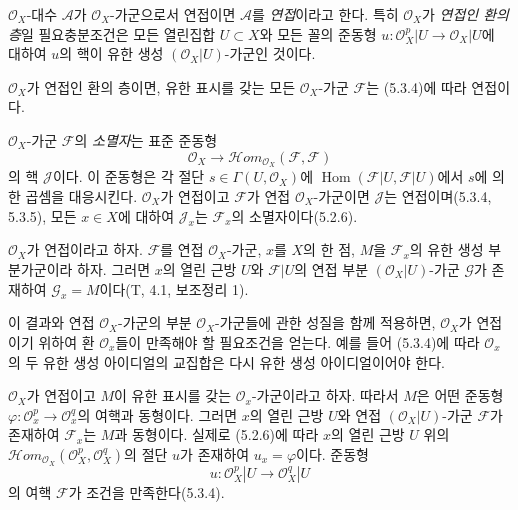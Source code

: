 \begin{env}[5.3.7]
\label{0.5.3.7-ko}
$\mathcal O_X$-대수 $\mathcal A$가 $\mathcal O_X$-가군으로서
연접이면 $\mathcal A$를 \emph{연접}이라고 한다. 특히
$\mathcal O_X$가 \emph{연접인 환의 층}일 필요충분조건은 모든
열린집합 $U\subset X$와 모든 꼴의 준동형
$u:\mathcal O_X^p|U\to\mathcal O_X|U$에 대하여 $u$의 핵이
유한 생성 $(\mathcal O_X|U)$-가군인 것이다.

$\mathcal O_X$가 연접인 환의 층이면, 유한 표시를 갖는 모든
$\mathcal O_X$-가군 $\mathcal F$는 (5.3.4)에 따라 연접이다.

$\mathcal O_X$-가군 $\mathcal F$의 \emph{소멸자}는 표준 준동형
\[
  \mathcal O_X\longrightarrow
  \mathcal H\!om_{\mathcal O_X}(\mathcal F,\mathcal F)
\]
의 핵 $\mathcal J$이다. 이 준동형은 각 절단
$s\in\Gamma(U,\mathcal O_X)$에
$\operatorname{Hom}(\mathcal F|U,\mathcal F|U)$에서 $s$에 의한
곱셈을 대응시킨다. $\mathcal O_X$가 연접이고 $\mathcal F$가 연접
$\mathcal O_X$-가군이면 $\mathcal J$는 연접이며(5.3.4, 5.3.5),
모든 $x\in X$에 대하여 $\mathcal J_x$는 $\mathcal F_x$의
소멸자이다(5.2.6).
\end{env}


\begin{env}[5.3.8]
\label{0.5.3.8-ko}
$\mathcal O_X$가 연접이라고 하자. $\mathcal F$를 연접
$\mathcal O_X$-가군, $x$를 $X$의 한 점, $M$을 $\mathcal F_x$의
유한 생성 부분가군이라 하자. 그러면 $x$의 열린 근방 $U$와
$\mathcal F|U$의 연접 부분 $(\mathcal O_X|U)$-가군 $\mathcal G$가
존재하여 $\mathcal G_x=M$이다(T, 4.1, 보조정리 1).

이 결과와 연접 $\mathcal O_X$-가군의 부분 $\mathcal O_X$-가군들에
관한 성질을 함께 적용하면, $\mathcal O_X$가 연접이기 위하여 환
$\mathcal O_x$들이 만족해야 할 필요조건을 얻는다. 예를 들어
(5.3.4)에 따라 $\mathcal O_x$의 두 유한 생성 아이디얼의 교집합은
다시 유한 생성 아이디얼이어야 한다.
\end{env}

\begin{env}[5.3.9]
\label{0.5.3.9-ko}
$\mathcal O_X$가 연접이고 $M$이 유한 표시를 갖는
$\mathcal O_x$-가군이라고 하자. 따라서 $M$은 어떤 준동형
$\varphi:\mathcal O_x^p\to\mathcal O_x^q$의 여핵과 동형이다. 그러면
$x$의 열린 근방 $U$와 연접 $(\mathcal O_X|U)$-가군 $\mathcal F$가
존재하여 $\mathcal F_x$는 $M$과 동형이다. 실제로 (5.2.6)에 따라
$x$의 열린 근방 $U$ 위의
$\mathcal H\!om_{\mathcal O_X}(\mathcal O_X^p,\mathcal O_X^q)$의
절단 $u$가 존재하여 $u_x=\varphi$이다. 준동형
\[
  u:\mathcal O_X^p|U\longrightarrow\mathcal O_X^q|U
\]
의 여핵 $\mathcal F$가 조건을 만족한다(5.3.4).
\end{env}

